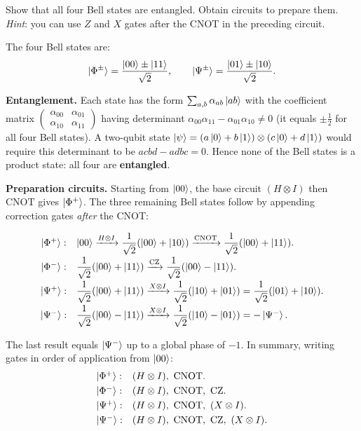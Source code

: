 \documentclass{ceri/sty/rapport}
\newcounter{exercice}[section]
\begin{document}
\begin{exercice}[p.~36]
Show that all four Bell states are entangled.
Obtain circuits to prepare them.
\textit{Hint}: you can use $Z$ and $X$ gates after the CNOT in the preceding
circuit.
\end{exercice}

\begin{solution}
The four Bell states are:
\[
  \ket{\Phi^\pm}=\frac{\ket{00}\pm\ket{11}}{\sqrt{2}},\qquad
  \ket{\Psi^\pm}=\frac{\ket{01}\pm\ket{10}}{\sqrt{2}}.
\]

\textbf{Entanglement.} Each state has the form $\sum_{a,b}\alpha_{ab}\ket{ab}$ with the coefficient matrix
$\begin{pmatrix}\alpha_{00}&\alpha_{01}\\\alpha_{10}&\alpha_{11}\end{pmatrix}$
having determinant $\alpha_{00}\alpha_{11}-\alpha_{01}\alpha_{10}\neq 0$
(it equals $\pm\tfrac{1}{2}$ for all four Bell states). A two-qubit state
$\ket{\psi}=(a\ket{0}+b\ket{1})\otimes(c\ket{0}+d\ket{1})$ would require this
determinant to be $acbd-adbc=0$. Hence none of the Bell states is a product state:
all four are \textbf{entangled}.

\medskip\noindent
\textbf{Preparation circuits.}
Starting from $\ket{00}$, the base circuit $(H\otimes I)$ then $\mathrm{CNOT}$ gives $\ket{\Phi^+}$.
The three remaining Bell states follow by appending correction gates \emph{after} the CNOT:

\[
\begin{array}{cl}
\ket{\Phi^+}: &
  \ket{00}\xrightarrow{H\otimes I}\dfrac{1}{\sqrt{2}}(\ket{00}+\ket{10})
  \xrightarrow{\mathrm{CNOT}}\dfrac{1}{\sqrt{2}}(\ket{00}+\ket{11}).\\[8pt]
\ket{\Phi^-}: &
  \dfrac{1}{\sqrt{2}}(\ket{00}+\ket{11})
  \xrightarrow{\mathrm{CZ}}\dfrac{1}{\sqrt{2}}(\ket{00}-\ket{11}).\\[8pt]
\ket{\Psi^+}: &
  \dfrac{1}{\sqrt{2}}(\ket{00}+\ket{11})
  \xrightarrow{X\otimes I}\dfrac{1}{\sqrt{2}}(\ket{10}+\ket{01})
  =\dfrac{1}{\sqrt{2}}(\ket{01}+\ket{10}).\\[8pt]
\ket{\Psi^-}: &
  \dfrac{1}{\sqrt{2}}(\ket{00}-\ket{11})
  \xrightarrow{X\otimes I}\dfrac{1}{\sqrt{2}}(\ket{10}-\ket{01})
  =-\ket{\Psi^-}.
\end{array}
\]

\noindent The last result equals $\ket{\Psi^-}$ up to a global phase of $-1$.
In summary, writing gates in order of application from $\ket{00}$:
\[
\begin{array}{ll}
\ket{\Phi^+}: & (H\otimes I),\ \mathrm{CNOT}.\\[3pt]
\ket{\Phi^-}: & (H\otimes I),\ \mathrm{CNOT},\ \mathrm{CZ}.\\[3pt]
\ket{\Psi^+}: & (H\otimes I),\ \mathrm{CNOT},\ (X\otimes I).\\[3pt]
\ket{\Psi^-}: & (H\otimes I),\ \mathrm{CNOT},\ \mathrm{CZ},\ (X\otimes I).
\end{array}
\]
\end{solution}
\end{document}
